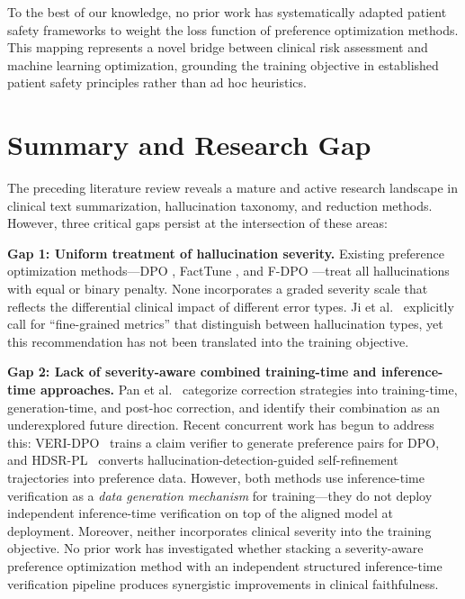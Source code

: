\documentclass[12pt,a4paper,oneside]{report}
\begin{document}
To the best of our knowledge, no prior work has systematically adapted patient safety frameworks to weight the loss function of preference optimization methods. This mapping represents a novel bridge between clinical risk assessment and machine learning optimization, grounding the training objective in established patient safety principles rather than ad hoc heuristics.


\section{Summary and Research Gap}
\label{sec:research-gap}

The preceding literature review reveals a mature and active research landscape in clinical text summarization, hallucination taxonomy, and reduction methods. However, three critical gaps persist at the intersection of these areas:

\textbf{Gap 1: Uniform treatment of hallucination severity.} Existing preference optimization methods---DPO \cite{rafailov2023dpo}, FactTune \cite{tian2024facttune}, and F-DPO \cite{chaduvula2026fdpo}---treat all hallucinations with equal or binary penalty. None incorporates a graded severity scale that reflects the differential clinical impact of different error types. Ji et al.~\cite{ji2023hallucination} explicitly call for ``fine-grained metrics'' that distinguish between hallucination types, yet this recommendation has not been translated into the training objective.

\textbf{Gap 2: Lack of severity-aware combined training-time and inference-time approaches.} Pan et al.~\cite{pan2024autocorrecting} categorize correction strategies into training-time, generation-time, and post-hoc correction, and identify their combination as an underexplored future direction. Recent concurrent work has begun to address this: VERI-DPO~\cite{liu2025veridpo} trains a claim verifier to generate preference pairs for DPO, and HDSR-PL~\cite{fang2025hdsrpl} converts hallucination-detection-guided self-refinement trajectories into preference data. However, both methods use inference-time verification as a \textit{data generation mechanism} for training---they do not deploy independent inference-time verification on top of the aligned model at deployment. Moreover, neither incorporates clinical severity into the training objective. No prior work has investigated whether stacking a severity-aware preference optimization method with an independent structured inference-time verification pipeline produces synergistic improvements in clinical faithfulness.
\end{document}
